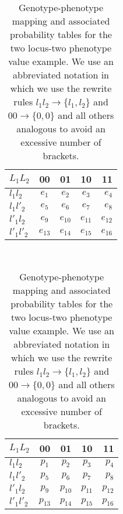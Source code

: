 \begin{table}
\centering
\begin{subtable}[t]{0.4\textwidth}
\centering
\begin{tabular}{ l || c | c | c | r }
	$L_1 L_2$  &	00 & 01 & 10 & 11\\ \hline
    $l_1 l_2$ & $e_1$ & $e_2$ & $e_3$ & $e_4$\\ \hline
    $l_1 l'_2$ & $e_5$ & $e_6$ & $e_7$ & $e_8$\\ \hline
    $l'_1 l_2$ & $e_9$ & $e_{10}$ & $e_{11}$ & $e_{12}$\\ \hline
    $l'_1 l'_2$ & $e_{13}$ & $e_{14}$ & $e_{15}$ & $e_{16}$\\
    \hline
    \end{tabular}
    \caption{genotype-phenotype maps}
    \label{tab:gpm}
\end{subtable}
~~~~~~
\begin{subtable}[t]{0.4\textwidth}
\centering
	\begin{tabular}{ l || c | c | c | r }
	$L_1 L_2$  &	00 & 01 & 10 & 11\\ \hline
    $l_1 l_2$ & $p_1$ & $p_2$ & $p_3$ & $p_4$\\ \hline
    $l_1 l'_2$ & $p_5$ & $p_6$ & $p_7$ & $p_8$\\ \hline
    $l'_1 l_2$ & $p_9$ & $p_{10}$ & $p_{11}$ & $p_{12}$\\ \hline
    $l'_1 l'_2$ & $p_{13}$ & $p_{14}$ & $p_{15}$ & $p_{16}$\\
    \hline
	\end{tabular}
	\caption{probabilities}
    \label{tab:probabilities}
\end{subtable}
\caption{Genotype-phenotype mapping and associated probability tables for the two locus-two phenotype value example. We use an abbreviated notation in which we use the rewrite rules $l_1 l_2 \rightarrow \{l_1, l_2\}$ and $00 \rightarrow \{0, 0\}$ and all others analogous to avoid an excessive number of brackets.}
\label{tab:example}
\end{table}
